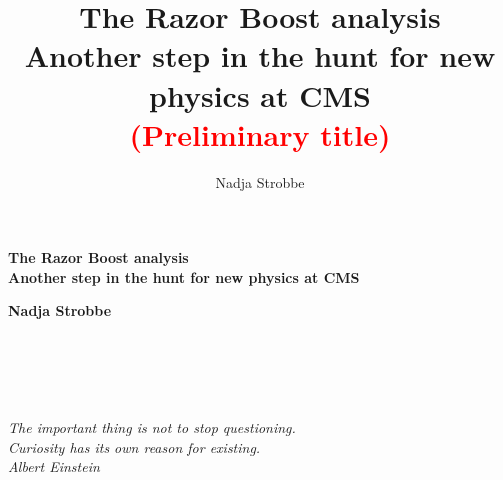 \documentclass[a4paper,11pt]{book}
\title{\Huge The Razor Boost analysis\\[1cm]
Another step in the hunt for new physics at CMS \\[0.5cm] \textcolor{red}{(Preliminary title)}}
\author{Nadja Strobbe}
\theoremstyle{definition}
\begin{document}
% 



\begin{titlepage}
\begin{center}


  \vspace{4cm}

  \begin{spacing}{1.2}
  {\Huge \bf The Razor Boost analysis\\[1cm]
  
   Another step in the hunt for new physics at CMS\par}

  \end{spacing}

  \vspace{2cm}

  {\LARGE \bf Nadja Strobbe}

\end{center}

\vfill


  \vspace{1eM}


\vspace{1ex}

  
  \vspace{2cm}
  
\end{titlepage}

\chapter*{~}
\thispagestyle{empty}
\begin{flushright}
\vspace{6cm}

\textsl{\large The important thing is not to stop questioning. \\Curiosity has its own reason for
existing.\\
\vspace{2eM}
Albert Einstein }
\end{flushright}
\end{document}
